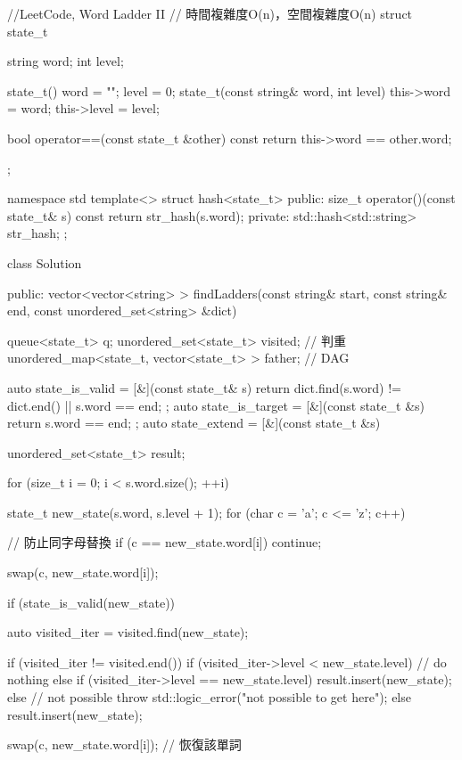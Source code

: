\begin{Code}
//LeetCode, Word Ladder II
// 時間複雜度O(n)，空間複雜度O(n)
struct state_t {
    string word;
    int level;

    state_t() { word = ""; level = 0; }
    state_t(const string& word, int level) {
        this->word = word;
        this->level = level;
    }

    bool operator==(const state_t &other) const {
        return this->word == other.word;
    }
};

namespace std {
    template<> struct hash<state_t> {
    public:
        size_t operator()(const state_t& s) const {
            return str_hash(s.word);
        }
    private:
        std::hash<std::string> str_hash;
    };
}


class Solution {
public:
    vector<vector<string> > findLadders(const string& start,
        const string& end, const unordered_set<string> &dict) {
        queue<state_t> q;
        unordered_set<state_t> visited; // 判重
        unordered_map<state_t, vector<state_t> > father; // DAG

        auto state_is_valid = [&](const state_t& s) {
            return dict.find(s.word) != dict.end() || s.word == end;
        };
        auto state_is_target = [&](const state_t &s) {return s.word == end; };
        auto state_extend = [&](const state_t &s) {
            unordered_set<state_t> result;

            for (size_t i = 0; i < s.word.size(); ++i) {
                state_t new_state(s.word, s.level + 1);
                for (char c = 'a'; c <= 'z'; c++) {
                    // 防止同字母替換
                    if (c == new_state.word[i]) continue;

                    swap(c, new_state.word[i]);

                    if (state_is_valid(new_state)) {
                        auto visited_iter = visited.find(new_state);

                        if (visited_iter != visited.end()) {
                            if (visited_iter->level < new_state.level) {
                                // do nothing
                            } else if (visited_iter->level == new_state.level) {
                                result.insert(new_state);
                            } else { // not possible
                                throw std::logic_error("not possible to get here");
                            }
                        } else {
                            result.insert(new_state);
                        }
                    }
                    swap(c, new_state.word[i]); // 恢復該單詞
                }
            }

}}}
\end{Code}

